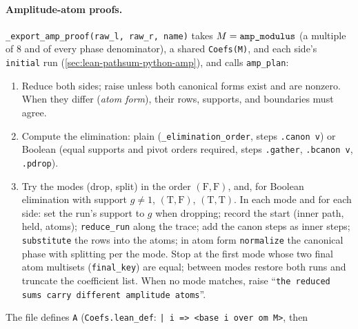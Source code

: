 \paragraph{Amplitude-atom proofs.} \textnormal{\texttt{\_\allowbreak{}export\_\allowbreak{}amp\_\allowbreak{}proof(\allowbreak{}raw\_\allowbreak{}l,\allowbreak{} raw\_\allowbreak{}r,\allowbreak{} name)}} takes
$M = \textnormal{\texttt{amp\_\allowbreak{}modulus}}$ (a multiple of $8$ and of every phase denominator), a shared
\textnormal{\texttt{Coefs(\allowbreak{}M)}}, and each side's \textnormal{\texttt{initial}} run (\cref{sec:lean-pathsum-python-amp}), and calls
\textnormal{\texttt{amp\_\allowbreak{}plan}}:
\begin{algorithm}\label{alg:lean-pathsum-ampplan}
\begin{enumerate}
\item Reduce both sides; raise unless both canonical forms exist and are nonzero. When they
  differ (\emph{atom form}), their rows, supports, and boundaries must agree.
\item Compute the elimination: plain (\textnormal{\texttt{\_\allowbreak{}elimination\_\allowbreak{}order}}, steps \textnormal{\texttt{.\allowbreak{}canon v}}) or Boolean
  (equal supports and pivot orders required, steps \textnormal{\texttt{.\allowbreak{}gather}}, \textnormal{\texttt{.\allowbreak{}bcanon v}}, \textnormal{\texttt{.\allowbreak{}pdrop}}).
\item Try the modes (drop, split) in the order $(\mathrm{F},\mathrm{F})$, and, for Boolean
  elimination with support $g\ne1$, $(\mathrm{T},\mathrm{F})$, $(\mathrm{T},\mathrm{T})$. In each
  mode and for each side: set the run's support to $g$ when dropping; record the start (inner
  path, held, atoms); \textnormal{\texttt{reduce\_\allowbreak{}run}} along the trace; add the canon steps as inner steps;
  \textnormal{\texttt{substitute}} the rows into the atoms; in atom form \textnormal{\texttt{normalize}} the canonical phase with
  splitting per the mode. Stop at the first mode whose two final atom multisets (\textnormal{\texttt{final\_\allowbreak{}key}})
  are equal; between modes restore both runs and truncate the coefficient list. When no mode
  matches, raise ``\texttt{the reduced sums carry different amplitude atoms}''.
\end{enumerate}
\end{algorithm}
\noindent The file defines \textnormal{\texttt{A}} (\textnormal{\texttt{Coefs.\allowbreak{}lean\_\allowbreak{}def}}: \textnormal{\texttt{| i => <base i over om M>}}, then
